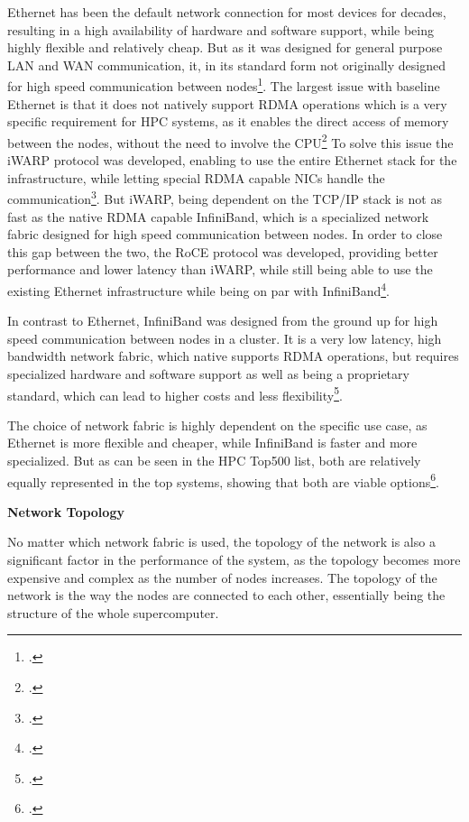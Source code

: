 Ethernet has been the default network connection for most devices for decades, resulting in a high availability of hardware and software support,
while being highly flexible and relatively cheap. But as it was designed for general purpose \ac{LAN} and \ac{WAN} communication,
it, in its standard form not originally designed for high speed communication between nodes\footcite{howardInfiniBandVsEthernet2023}.
The largest issue with baseline Ethernet is that it does not natively support \ac{RDMA} operations which is a very specific
requirement for \ac{HPC} systems, as it enables the direct access of memory between the nodes, without the need to involve the \ac{CPU}\footcite{rdmaconsortiumRDMAConsortiumFAQs2003}
To solve this issue the \ac{iWARP} protocol was developed, enabling to use the entire Ethernet stack for the infrastructure,
while letting special \ac{RDMA} capable \ac{NIC}s handle the communication\footcite{intelUnderstandingIWARPDelivering2010}.
But \ac{iWARP}, being dependent on the \ac{TCP/IP} stack is not as fast as the native \ac{RDMA} capable InfiniBand,
which is a specialized network fabric designed for high speed communication between nodes.
In order to close this gap between the two, the \ac{RoCE} protocol was developed, providing better performance and
lower latency than \ac{iWARP}, while still being able to use the existing Ethernet infrastructure while being on par with InfiniBand\footcite{howardInfiniBandVsEthernet2023}.

In contrast to Ethernet, InfiniBand was designed from the ground up for high speed communication between nodes in a cluster.
It is a very low latency, high bandwidth network fabric, which native supports \ac{RDMA} operations, but requires specialized hardware and software support
as well as being a proprietary standard, which can lead to higher costs and less flexibility\footcite{pfisterIntroductionInfiniBandArchitecture}.

The choice of network fabric is highly dependent on the specific use case, as Ethernet is more flexible and cheaper, while InfiniBand is faster and more specialized.
But as can be seen in the \ac{HPC} Top500 list, both are relatively equally represented in the top systems, showing that both are viable options\footcite{top500ListStatisticsInterconnect}.

\textbf{Network Topology}
\label{sec:network_topology}

No matter which network fabric is used, the topology of the network is also a significant factor in the performance of the system, as the topology
becomes more expensive and complex as the number of nodes increases. The topology of the network is the way the nodes are connected to each other,
essentially being the structure of the whole supercomputer.

